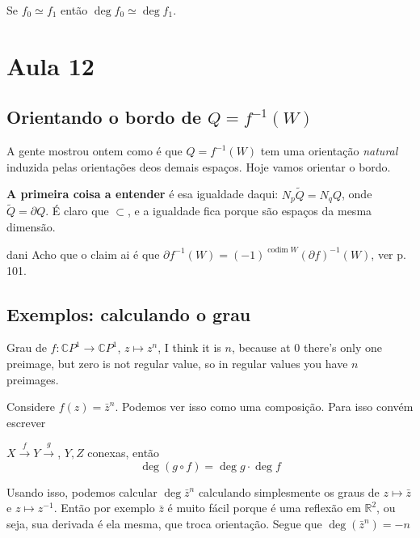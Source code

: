 \begin{remark}\leavevmode
Se \(f_0 \simeq f_1\) então \(\operatorname{deg}f_0 \simeq \operatorname{deg}f_1\).
\end{remark}

\section{Aula 12}

\subsection{Orientando o bordo de \(Q=f^{-1}(W)\)}

A gente mostrou ontem como é que \(Q=f^{-1}(W)\) tem uma orientação \textit{natural} induzida pelas orientações deos demais espaços. Hoje vamos orientar o bordo.

\textbf{A primeira coisa a entender}  é esa igualdade daqui: \(N_p\tilde{Q}=N_qQ\), onde \(\tilde{Q}=\partial Q\). É claro que \(\subset\), e a igualdade fica porque são espaços da mesma dimensão.

\begin{thing5}{dani}\leavevmode
Acho que o claim ai é que \(\partial f^{-1}(W)=(-1)^{\operatorname{codim}W}(\partial f)^{-1}(W)\), ver \cite{gui} p. 101.  \end{thing5}

\subsection{Exemplos: calculando o grau}

\begin{example}\leavevmode
Grau de \(f:\mathbb{C}P^{1}\to \mathbb{C}P^{1}\), \(z \mapsto  z^n\), I think it is \(n\), because at 0 there's only one preimage, but zero is not regular value, so in regular values you have \(n\) preimages.

Considere \(f(z)=\bar{z}^{n}\). Podemos ver isso como uma composição. Para isso convém escrever

\begin{claim}\leavevmode
\(X \xrightarrow{f}Y \xrightarrow{g}\), \(Y,Z\) conexas, então
\[\operatorname{deg}(g \circ f)=\operatorname{deg}g \cdot \operatorname{deg}f\]
\end{claim}

Usando isso, podemos calcular \(\operatorname{deg} \bar{z}^n\) calculando simplesmente os graus de \(z \mapsto  \bar{z}\) e \(z\mapsto  z^{-1}\). Então por exemplo \(\bar{z}\) é muito fácil porque é uma reflexão em \(\mathbb{R}^2\), ou seja, sua derivada é ela mesma, que troca orientação. Segue que \(\operatorname{deg}(\bar{z}^n)=-n\)
\end{example}

